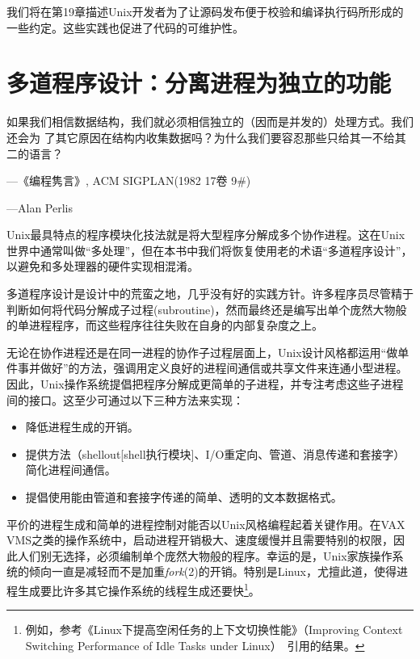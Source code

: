 \documentclass[12pt,oneside]{ctexbook}
\begin{document}
\begin{common-format}
我们将在第19章描述Unix开发者为了让源码发布便于校验和编译执行码所形成的一些约定。这些实践也促进了代码的可维护性。


\chapter{多道程序设计：分离进程为独立的功能}
\begin{flushright}
\begin{notecard}{30em}
如果我们相信数据结构，我们就必须相信独立的（因而是并发的）处理方式。我们还会为
了其它原因在结构内收集数据吗？为什么我们要容忍那些只给其一不给其二的语言？

{\hfill —《编程隽言》, ACM SIGPLAN(1982 17卷 9\#{})}

{\hfill —Alan Perlis}
\end{notecard}
\end{flushright}

Unix最具特点的程序模块化技法就是将大型程序分解成多个协作进程。这在Unix世界中通常叫做“多处理”，但在本书中我们将恢复使用老的术语“多道程序设计”，以避免和多处理器的硬件实现相混淆。

多道程序设计是设计中的荒蛮之地，几乎没有好的实践方针。许多程序员尽管精于判断如何将代码分解成子过程(subroutine)，然而最终还是编写出单个庞然大物般的单进程程序，而这些程序往往失败在自身的内部复杂度之上。

无论在协作进程还是在同一进程的协作子过程层面上，Unix设计风格都运用“做单件事并做好”的方法，强调用定义良好的进程间通信或共享文件来连通小型进程。因此，Unix操作系统提倡把程序分解成更简单的子进程，并专注考虑这些子进程间的接口。这至少可通过以下三种方法来实现：
\begin{itemize}
\item 降低进程生成的开销。
\item 提供方法（shellout[shell执行模块]、I/O重定向、管道、消息传递和套接字）简化进程间通信。
\item 提倡使用能由管道和套接字传递的简单、透明的文本数据格式。
\end{itemize}

平价的进程生成和简单的进程控制对能否以Unix风格编程起着关键作用。在VAX VMS之类的操作系统中，启动进程开销极大、速度缓慢并且需要特别的权限，因此人们别无选择，必须编制单个庞然大物般的程序。幸运的是，Unix家族操作系统的倾向一直是减轻而不是加重\textit{fork}(2)的开销。特别是Linux，尤擅此道，使得进程生成要比许多其它操作系统的线程生成还要快\footnote{例如，参考《Linux下提高空闲任务的上下文切换性能》（Improving Context Switching Performance of Idle Tasks under Linux）~\cite{Appleton}引用的结果。}。


\end{common-format}
\end{document}
